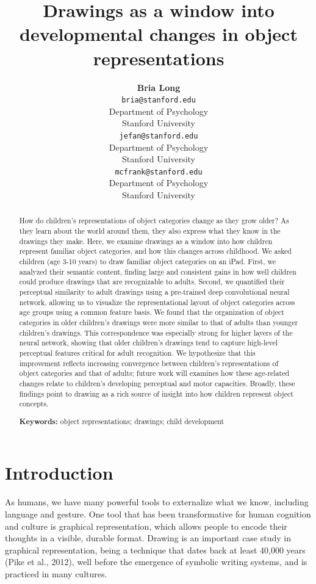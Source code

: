 \documentclass[10pt, letterpaper]{article}
\title{Drawings as a window into developmental changes in object
representations}
\author{{\large \bf Bria Long} \\ \texttt{bria@stanford.edu} \\ Department of Psychology \\ Stanford University \And {\large \bf Judith E. Fan} \\ \texttt{jefan@stanford.edu} \\ Department of Psychology \\ Stanford University \And {\large \bf Michael C. Frank } \\ \texttt{mcfrank@stanford.edu} \\ Department of Psychology \\ Stanford University}
\begin{document}
\maketitle

\begin{abstract}
How do children's representations of object categories change as they
grow older? As they learn about the world around them, they also express
what they know in the drawings they make. Here, we examine drawings as a
window into how children represent familiar object categories, and how
this changes across childhood. We asked children (age 3-10 years) to
draw familiar object categories on an iPad. First, we analyzed their
semantic content, finding large and consistent gains in how well
children could produce drawings that are recognizable to adults. Second,
we quantified their perceptual similarity to adult drawings using a
pre-trained deep convolutional neural network, allowing us to visualize
the representational layout of object categories across age groups using
a common feature basis. We found that the organization of object
categories in older children's drawings were more similar to that of
adults than younger children's drawings. This correspondence was
especially strong for higher layers of the neural network, showing that
older children's drawings tend to capture high-level perceptual features
critical for adult recognition. We hypothesize that this improvement
reflects increasing convergence between children's representations of
object categories and that of adults; future work will examines how
these age-related changes relate to children's developing perceptual and
motor capacities. Broadly, these findings point to drawing as a rich
source of insight into how children represent object concepts.

\textbf{Keywords:}
object representations; drawings; child development
\end{abstract}

\newcommand{\wrapmf}[1]{#1} 





\section{Introduction}\label{introduction}

As humans, we have many powerful tools to externalize what we know,
including language and gesture. One tool that has been transformative
for human cognition and culture is graphical representation, which
allows people to encode their thoughts in a visible, durable format.
Drawing is an important case study in graphical representation, being a
technique that dates back at least 40,000 years (Pike et al., 2012),
well before the emergence of symbolic writing systems, and is practiced
in many cultures.
\end{document}
